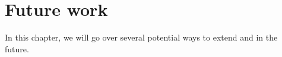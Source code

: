 \chapter{Future work}

In this chapter, we will go over several potential ways to extend \Chick{} and
\Coop{} in the future.



%

